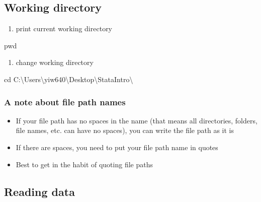 \documentclass[
]{book}
\newenvironment{Shaded}{\begin{snugshade}}{\end{snugshade}}
\newcommand{\NormalTok}[1]{#1}
\providecommand{\tightlist}{%
  \setlength{\itemsep}{0pt}\setlength{\parskip}{0pt}}
\begin{document}
\hypertarget{working-directory}{%
\subsection{Working directory}\label{working-directory}}

\begin{enumerate}
\def\labelenumi{\arabic{enumi}.}
\tightlist
\item
  print current working directory
\end{enumerate}

\begin{Shaded}
\begin{Highlighting}[]
\NormalTok{pwd }
\end{Highlighting}
\end{Shaded}

\begin{enumerate}
\def\labelenumi{\arabic{enumi}.}
\setcounter{enumi}{1}
\tightlist
\item
  change working directory
\end{enumerate}

\begin{Shaded}
\begin{Highlighting}[]
\NormalTok{cd C:\textbackslash{}Users\textbackslash{}yiw640\textbackslash{}Desktop\textbackslash{}StataIntro\textbackslash{}}
\end{Highlighting}
\end{Shaded}

\hypertarget{a-note-about-file-path-names}{%
\subsubsection{A note about file path names}\label{a-note-about-file-path-names}}

\begin{itemize}
\tightlist
\item
  If your file path has no spaces in the name (that means all directories, folders, file names, etc. can have no spaces), you can write the file path as it is
\item
  If there are spaces, you need to put your file path name in quotes
\item
  Best to get in the habit of quoting file paths
\end{itemize}

\hypertarget{reading-data-2}{%
\subsection{Reading data}\label{reading-data-2}}
\end{document}
